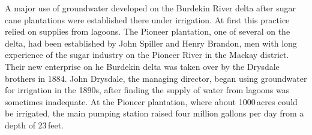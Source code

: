 A major use of groundwater developed on the Burdekin River
 delta after sugar cane
plantations were established there under irrigation.  At first this
practice relied on supplies from lagoons.  The Pioneer plantation, one
of several on the delta, had been established by John Spiller and
  Henry Brandon,  men with long
experience of the sugar industry on the Pioneer River
 in the Mackay district.
Their new enterprise on he Burdekin delta was taken over by the
Drysdale brothers  in 1884.  John Drysdale, the
managing director, began using groundwater for irrigation in the
1890s, after finding the supply of water from lagoons was sometimes
inadequate.  At the Pioneer plantation, where about 1000\,acres could
be irrigated, the main pumping station raised four million gallons per
day from a depth of
23\,feet.


